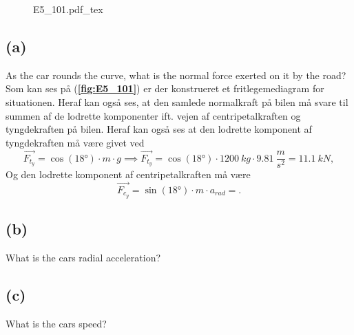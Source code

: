 \documentclass[12pt]{article}
\newcommand{\incfig}[2][1]{%
    \def\svgwidth{#1\columnwidth}
    {#2.pdf_tex}
}
\begin{document}
\begin{figure}[ht]
  \centering
  \incfig[0.8]{E5_101}
  \caption{}
  \label{fig:E5_101}
\end{figure}

\subsection*{(a)}
As the car rounds the curve, what is the normal force exerted on it by the road?
\bigbreak
Som kan ses på (\textbf{\autoref{fig:E5_101}}) er der konstrueret et fritlegemediagram for situationen. Heraf kan også ses, at den samlede normalkraft på bilen må svare til summen af de lodrette komponenter ift. vejen af centripetalkraften og tyngdekraften på bilen. Heraf kan også ses at den lodrette komponent af tyngdekraften må være givet ved
\[
  \Vec{F_{t_y}} = \cos(\ang{18})\cdot m\cdot g \implies \Vec{F_{t_y}} = \cos(\ang{18})\cdot \qty{1200}{kg}\cdot \qty{9,81}{\frac{m}{s^2}} = \qty{11,1}{kN}
,\] 
Og den lodrette komponent af centripetalkraften må være
\[
\Vec{F_{c_y}} = \sin(\ang{18})\cdot m\cdot a_{rad} = 
.\] 

\subsection*{(b)}
What is the cars radial acceleration?


\subsection*{(c)}
What is the cars speed?

  
\end{document}
